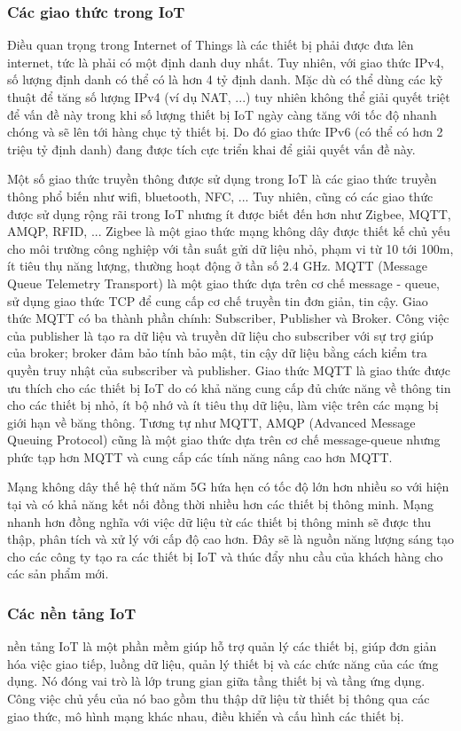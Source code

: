 \subsubsection{Các giao thức trong IoT}
Điều quan trọng trong Internet of Things là các thiết bị phải được đưa lên internet, tức là phải có một định danh duy nhất. Tuy nhiên, với giao thức IPv4, số lượng định danh có thể có là hơn 4 tỷ định danh. Mặc dù có thể dùng các kỹ thuật để tăng số lượng IPv4 (ví dụ NAT, ...) tuy nhiên không thể giải quyết triệt để vấn đề này trong khi số lượng thiết bị IoT ngày càng tăng với tốc độ nhanh chóng và sẽ lên tới hàng chục tỷ thiết bị. Do đó giao thức IPv6 (có thể có hơn 2 triệu tỷ định danh) đang được tích cực triển khai để giải quyết vấn đề này. 

Một số giao thức truyền thông được sử dụng trong IoT là các giao thức truyền thông phổ biến như wifi, bluetooth, NFC, ... Tuy nhiên, cũng có các giao thức được sử dụng rộng rãi trong IoT nhưng ít được biết đến hơn như Zigbee, MQTT, AMQP, RFID, ... Zigbee là một giao thức mạng không dây được thiết kế chủ yếu cho môi trường công nghiệp với tần suất gửi dữ liệu nhỏ, phạm vi từ 10 tới 100m, ít tiêu thụ năng lượng, thường hoạt động ở tần số 2.4 GHz. MQTT (Message Queue Telemetry Transport) là một giao thức dựa trên cơ chế message - queue, sử dụng giao thức TCP để cung cấp cơ chế truyền tin đơn giản, tin cậy. Giao thức MQTT có ba thành phần chính: Subscriber, Publisher và Broker. Công việc của publisher là tạo ra dữ liệu và truyền dữ liệu cho subscriber với sự trợ giúp của broker; broker đảm bảo tính bảo mật, tin cậy dữ liệu bằng cách kiểm tra quyền truy nhật của subscriber và publisher. Giao thức MQTT là giao thức được ưu thích cho các thiết bị IoT do có khả năng cung cấp đủ chức năng về thông tin cho các thiết bị nhỏ, ít bộ nhớ và ít tiêu thụ dữ liệu, làm việc trên các mạng bị giới hạn về băng thông. Tương tự như MQTT, AMQP (Advanced Message Queuing Protocol) cũng là một giao thức dựa trên cơ chế message-queue nhưng phức tạp hơn MQTT và cung cấp các tính năng nâng cao hơn MQTT.

Mạng không dây thế hệ thứ năm 5G hứa hẹn có tốc độ lớn hơn nhiều so với hiện tại và có khả năng kết nối đồng thời nhiều hơn các thiết bị thông minh. Mạng nhanh hơn đồng nghĩa với việc dữ liệu từ các thiết bị thông minh sẽ được thu thập, phân tích và xử lý với cấp độ cao hơn. Đây sẽ là nguồn năng lượng sáng tạo cho các công ty tạo ra các thiết bị IoT và thúc đẩy nhu cầu của khách hàng cho các sản phẩm mới. 

\subsubsection{Các nền tảng IoT}
nền tảng IoT là một phần mềm giúp hỗ trợ quản lý các thiết bị, giúp đơn giản hóa việc giao tiếp, luồng dữ liệu, quản lý thiết bị và các chức năng của các ứng dụng. Nó đóng vai trò là lớp trung gian giữa tầng thiết bị và tầng ứng dụng. Công việc chủ yếu của nó bao gồm thu thập dữ liệu từ thiết bị thông qua các giao thức, mô hình mạng khác nhau, điều khiển và cấu hình các thiết bị. 

